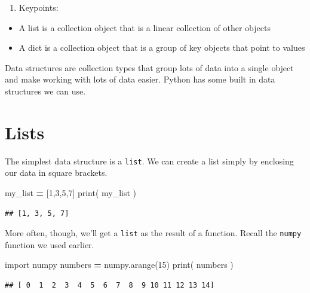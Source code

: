 \documentclass[]{book}
\newenvironment{Shaded}{\begin{snugshade}}{\end{snugshade}}
\newcommand{\BuiltInTok}[1]{#1}
\newcommand{\DecValTok}[1]{\textcolor[rgb]{0.00,0.00,0.81}{#1}}
\newcommand{\ImportTok}[1]{#1}
\newcommand{\NormalTok}[1]{#1}
\newcommand{\OperatorTok}[1]{\textcolor[rgb]{0.81,0.36,0.00}{\textbf{#1}}}
\providecommand{\tightlist}{%
  \setlength{\itemsep}{0pt}\setlength{\parskip}{0pt}}
\theoremstyle{definition}
\theoremstyle{definition}
\theoremstyle{definition}
\theoremstyle{remark}
\begin{document}
\begin{enumerate}
\def\labelenumi{\arabic{enumi}.}
\setcounter{enumi}{2}
\tightlist
\item
  Keypoints:
\end{enumerate}

\begin{itemize}
\tightlist
\item
  A list is a collection object that is a linear collection of other
  objects
\item
  A dict is a collection object that is a group of key objects that
  point to values
\end{itemize}

Data structures are collection types that group lots of data into a
single object and make working with lots of data easier. Python has some
built in data structures we can use.

\hypertarget{lists}{%
\section{Lists}\label{lists}}

The simplest data structure is a \texttt{list}. We can create a list
simply by enclosing our data in square brackets.

\begin{Shaded}
\begin{Highlighting}[]
\NormalTok{my_list }\OperatorTok{=}\NormalTok{ [}\DecValTok{1}\NormalTok{,}\DecValTok{3}\NormalTok{,}\DecValTok{5}\NormalTok{,}\DecValTok{7}\NormalTok{]}
\BuiltInTok{print}\NormalTok{( my_list )}
\end{Highlighting}
\end{Shaded}

\begin{verbatim}
## [1, 3, 5, 7]
\end{verbatim}

More often, though, we'll get a \texttt{list} as the result of a
function. Recall the \texttt{numpy} function we used earlier.

\begin{Shaded}
\begin{Highlighting}[]
\ImportTok{import}\NormalTok{ numpy}
\NormalTok{numbers }\OperatorTok{=}\NormalTok{ numpy.arange(}\DecValTok{15}\NormalTok{)}
\BuiltInTok{print}\NormalTok{( numbers )}
\end{Highlighting}
\end{Shaded}

\begin{verbatim}
## [ 0  1  2  3  4  5  6  7  8  9 10 11 12 13 14]
\end{verbatim}
\end{document}
